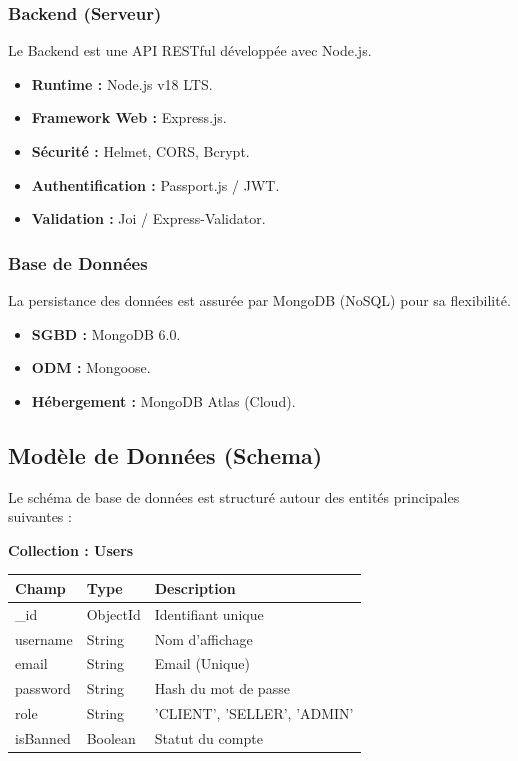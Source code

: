 \documentclass[12pt,a4paper]{article}
\begin{document}
\subsubsection{Backend (Serveur)}
Le Backend est une API RESTful développée avec Node.js.
\begin{itemize}
    \item \textbf{Runtime :} Node.js v18 LTS.
    \item \textbf{Framework Web :} Express.js.
    \item \textbf{Sécurité :} Helmet, CORS, Bcrypt.
    \item \textbf{Authentification :} Passport.js / JWT.
    \item \textbf{Validation :} Joi / Express-Validator.
\end{itemize}

\subsubsection{Base de Données}
La persistance des données est assurée par MongoDB (NoSQL) pour sa flexibilité.
\begin{itemize}
    \item \textbf{SGBD :} MongoDB 6.0.
    \item \textbf{ODM :} Mongoose.
    \item \textbf{Hébergement :} MongoDB Atlas (Cloud).
\end{itemize}

\subsection{Modèle de Données (Schema)}

Le schéma de base de données est structuré autour des entités principales suivantes :

\textbf{Collection : Users}
\begin{tabularx}{\textwidth}{|l|l|X|}
    \hline
    \textbf{Champ} & \textbf{Type} & \textbf{Description} \\ \hline
    \_id & ObjectId & Identifiant unique \\ \hline
    username & String & Nom d'affichage \\ \hline
    email & String & Email (Unique) \\ \hline
    password & String & Hash du mot de passe \\ \hline
    role & String & 'CLIENT', 'SELLER', 'ADMIN' \\ \hline
    isBanned & Boolean & Statut du compte \\ \hline
\end{tabularx}
\end{document}
